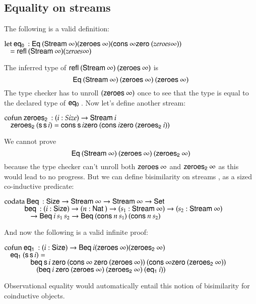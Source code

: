 \subsection{Equality on streams}
The following is a valid definition:
\begin{bsp}
$\mathrm{let}\: \mathsf{eq_0}\: : \mathsf{Eq}\: (\mathsf{Stream}\: \infty) (\mathsf{zeroes}\: \infty) (\mathsf{cons}\: \infty \mathsf{zero}\: (zeroes \infty))$\\
$\hspace*{3mm} = \mathsf{refl}\: (\mathsf{Stream}\: \infty) (zeroes \infty)$
\end{bsp}
The inferred type of $\mathsf{refl}\: (\mathsf{Stream}\: \infty) \: (\mathsf{zeroes}\: \infty)$ is 
\[\mathsf{Eq}\: (\mathsf{Stream}\: \infty) \: (\mathsf{zeroes}\: \infty) \: (\mathsf{zeroes}\: \infty)\]
The type checker has to unroll $(\mathsf{zeroes}\: \infty)$ once to see that the type is equal to the declared type of $\mathsf{eq_0}\:$.
Now let's define another stream:
\begin{bsp}
$\mathrm{cofun}\: \mathsf{zeroes_2}\:: ( i : Size ) \rightarrow{\mathsf{Stream}\:i} $ \\
$\hspace*{3mm} \mathsf{zeroes_2}\: (\mathsf{s}\, \mathsf{s}\, i) = \mathsf{cons}\: \mathsf{s}\, i \mathsf{zero}\: (\mathsf{cons}\: i \mathsf{zero}\: (\mathsf{zeroes_2}\: i))$\\
\end{bsp}
We cannot prove \[\mathsf{Eq}\: (\mathsf{Stream}\: \infty) \: (\mathsf{zeroes}\: \infty) \: (\mathsf{zeroes_2}\: \infty)\]
because the type checker can't unroll both $\mathsf{zeroes}\: \infty$ and $\mathsf{zeroes_2}\: \infty$ as
this would lead to no progress.
But we can define bisimilarity on streams \cite{coquand-infinite}, as a sized co-inductive predicate:
\begin{bsp}
$\mathrm{codata}\: \mathsf{Beq}\: : \mathsf{Size} \rightarrow \mathsf{Stream}\: \infty \rightarrow \mathsf{Stream}\: \infty \rightarrow \mathsf{Set}$\\
$ \spcx \beq : (i : \Size ) \ra ( n : \Nat ) \ra (s_1 : \Stream \infty ) \ra (s_2 : \Stream \infty )$\\
$ \spcx \spc  \ra \beqd i \: s_1 \: s_2 \ra \beqd (\cons n \: s_1) \: (\cons n \: s_2)$
\end{bsp}
\noindent And now the following is a valid infinite proof:
\begin{bsp}
$\mathrm{cofun}\: \mathsf{eq_1}\: : (i : \mathsf{Size} ) \rightarrow \mathsf{Beq}\: i (\mathsf{zeroes}\: \infty) (\mathsf{zeroes_2}\: \infty)$\\
$\hspace*{3mm} \mathsf{eq_1}\: (\mathsf{s}\, \mathsf{s}\, i) = $\\
$\spc \spcx \beq \s i \: \zero (\cons \infty \: \zero (\zeroes \infty)) \: (\cons \infty \zero (\zeroest \infty))$\\ 
$\spc \spcx \spc (\beq i \: \zero (\zeroes \infty) \: (\zeroest \infty) \: (\eqt i))$
\end{bsp}
Observational equality \cite{conf/plpv/AltenkirchMS07} would automatically entail this notion of bisimilarity for coinductive objects.

